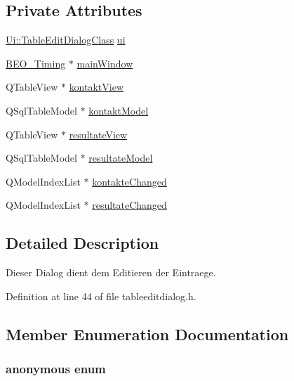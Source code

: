 \subsection*{Private Attributes}
\begin{CompactItemize}
\item 
\hyperlink{class_ui_1_1_table_edit_dialog_class}{Ui::TableEditDialogClass} \hyperlink{class_table_edit_dialog_f63889b474e6ccf0d2dc0d7c1deb44c9}{ui}
\item 
\hyperlink{class_b_e_o___timing}{BEO\_\-Timing} $\ast$ \hyperlink{class_table_edit_dialog_91a07844cd384a7efa73a77d2e168586}{mainWindow}
\item 
QTableView $\ast$ \hyperlink{class_table_edit_dialog_a6e15d4f17c02c81f8a1221ed1e789b5}{kontaktView}
\item 
QSqlTableModel $\ast$ \hyperlink{class_table_edit_dialog_2bccfca0a956c1fe7e4272e435456b8e}{kontaktModel}
\item 
QTableView $\ast$ \hyperlink{class_table_edit_dialog_3ae273e36ee898643059e8963ed9f557}{resultateView}
\item 
QSqlTableModel $\ast$ \hyperlink{class_table_edit_dialog_c544c898094d550a4df24603738d576d}{resultateModel}
\item 
QModelIndexList $\ast$ \hyperlink{class_table_edit_dialog_779a6767b90cf2a0f67d4fd3a0eef79e}{kontakteChanged}
\item 
QModelIndexList $\ast$ \hyperlink{class_table_edit_dialog_9bc0694e38258f5d52f1b2abf65f7ba3}{resultateChanged}
\end{CompactItemize}


\subsection{Detailed Description}
Dieser Dialog dient dem Editieren der Eintraege. 

Definition at line 44 of file tableeditdialog.h.

\subsection{Member Enumeration Documentation}
\hypertarget{class_table_edit_dialog_86c177ed9439b08e0b6cfc902a3d2cc7}{
\subsubsection["@3]{\setlength{\rightskip}{0pt plus 5cm}anonymous enum}}
\label{class_table_edit_dialog_86c177ed9439b08e0b6cfc902a3d2cc7}



